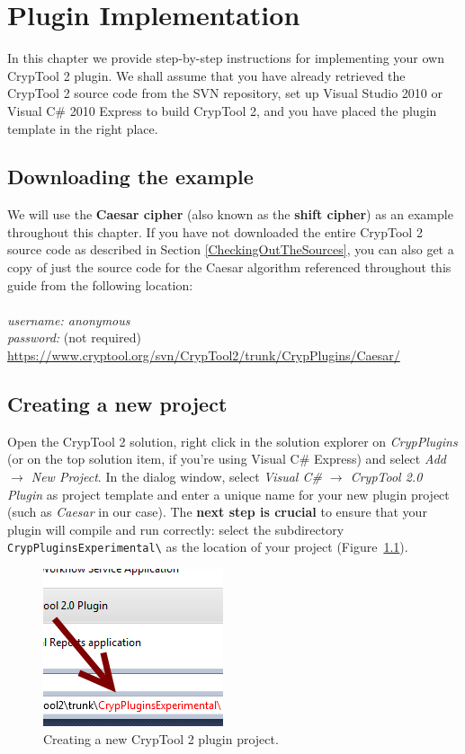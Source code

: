 \chapter{Plugin Implementation}
\label{sec:PluginImplementation}
In this chapter we provide step-by-step instructions for implementing your own CrypTool 2 plugin. We shall assume that you have already retrieved the CrypTool 2 source code from the SVN repository, set up Visual Studio 2010 or Visual C\# 2010 Express to build CrypTool 2, and you have placed the plugin template in the right place.

\section{Downloading the example}
\label{sec:DownloadingTheExample}

We will use the \textbf{Caesar cipher} (also known as the \textbf{shift cipher}) as an example throughout this chapter. If you have not downloaded the entire CrypTool 2 source code as described in Section \ref{CheckingOutTheSources}, you can also get a copy of just the source code for the Caesar algorithm referenced throughout this guide from the following location:\\\\
\textit{username: anonymous\\
password:} (not required)\\
\url{https://www.cryptool.org/svn/CrypTool2/trunk/CrypPlugins/Caesar/}

\section{Creating a new project}
\label{sec:CreatingANewProject}

Open the CrypTool 2 solution, right click in the solution explorer on \textit{CrypPlugins} (or on the top solution item, if you're using Visual C\# Express) and select \textit{Add~$\rightarrow$ New Project}. In the dialog window, select \textit{Visual C\# $\rightarrow$ CrypTool 2.0 Plugin} as project template and enter a unique name for your new plugin project (such as \textit{Caesar} in our case). The \textbf{next step is crucial} to ensure that your plugin will compile and run correctly: select the subdirectory \texttt{CrypPluginsExperimental\textbackslash} as the location of your project (Figure~\ref{fig:vs_create_new_project}).

\begin{figure}[h!]
	\centering
		\includegraphics{figures/vs_create_new_project.png}
	\caption{Creating a new CrypTool 2 plugin project.}
	\label{fig:vs_create_new_project}
\end{figure}


